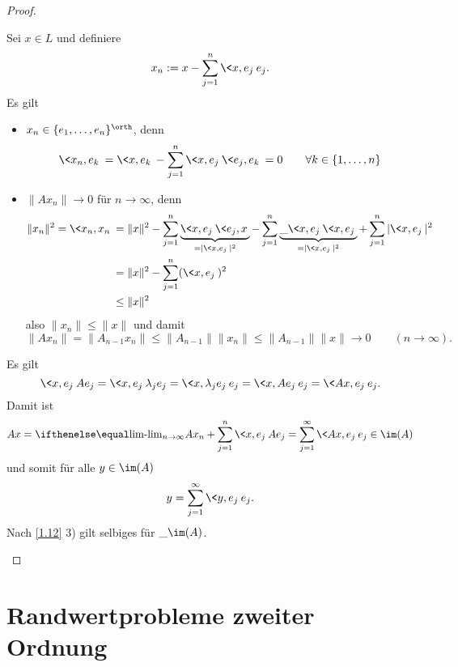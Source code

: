 \begin{st}
\begin{proof}
\begin{enumerate}[1)]
				Sei $x \in L$ und definiere
				\[
					x_n := x - \sum_{j=1}^n \<x,e_j\> e_j.
				\]
				Es gilt
				\begin{itemize}
					\item
						$x_n \in \{e_1,\dotsc,e_n\}^\orth$, denn
						\[
							\<x_n, e_k\> = \<x, e_k\> - \sum_{j=1}^n \<x,e_j\> \<e_j, e_k\> = 0
							\qquad \forall k \in \{1, \dotsc, n\}
						\]
					\item
						$\|Ax_n\| \to 0$ für $n\to \infty$, denn
						\begin{align*}
							\|x_n\|^2  = \<x_n, x_n\>
							&= \|x\|^2 - \sum_{j=1}^n \underbrace{\<x,e_j\>\<e_j,x\>}_{=|\<x,e_j\>|^2} - \sum_{j=1}^n \underbrace{\_{\<x,e_j\>} \<x,e_j\>}_{=|\<x,e_j\>|^2} + \sum_{j=1}^n |\<x,e_j\>|^2 \\
							&= \|x\|^2 - \sum_{j=1}^n (\<x,e_j\>)^2 \\
							&\le \|x\|^2
						\end{align*}
						also $\|x_n\| \le \|x\|$ und damit
						\[
							\|Ax_n\| = \|A_{n-1}x_n\| \le \|A_{n-1}\| \|x_n\| \le \|A_{n-1}\| \|x\| \to 0
							\qquad (n \to \infty).
						\]
				\end{itemize}
				Es gilt
				\[
					\<x,e_j\> A e_j
					= \<x,e_j\> \lambda_j e_j
					= \<x,\lambda_j e_j\> e_j
					= \<x,A e_j\> e_j
					= \<Ax,e_j\> e_j.
				\]
				Damit ist
				\[
					Ax = \lim_{n\to\infty} Ax_n + \sum_{j=1}^n \<x,e_j\> Ae_j = \sum_{j=1}^\infty \<Ax, e_j\> e_j \in \im (A)
				\]
				und somit für alle $y \in \im (A)$
				\[
					y = \sum_{j=1}^\infty \<y,e_j\> e_j.
				\]
				Nach \ref{1.12} 3) gilt selbiges für $\_{\im (A)}$.
		\end{enumerate}
	\end{proof}
\end{st}


\section{Randwertprobleme zweiter Ordnung}


